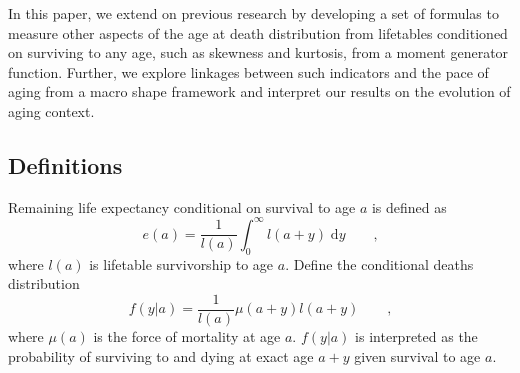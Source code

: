 \documentclass{article}
\newcommand{\dd}{\; \mathrm{d}}
\newcommand{\tc}{\quad\quad\text{,}}
\begin{document}
In this paper, we extend on previous research by developing a set of formulas to measure other aspects of the age at death distribution from lifetables conditioned on surviving to any age, such as skewness and kurtosis, from a moment generator function. Further, we explore linkages between such indicators and the pace of aging from a macro shape framework and interpret our results on the evolution of aging context.

\subsection*{Definitions}

Remaining life expectancy conditional on survival to age $a$ is defined as
\begin{equation}
e(a) = \frac{1}{l(a)}\int_0^\infty l(a+y) \dd y \tc
\end{equation}
where $l(a)$ is lifetable survivorship to age $a$.
Define the
conditional deaths distribution
\begin{equation}
\label{eq:fya}
f(y|a) = \frac{1}{l(a)} \mu(a+y) l(a+y) \tc
\end{equation}
where $\mu(a)$ is the force of mortality at age $a$. $f(y|a)$ is interpreted as
the probability of surviving to and dying at exact age $a+y$ given survival to
age $a$.
\end{document}
